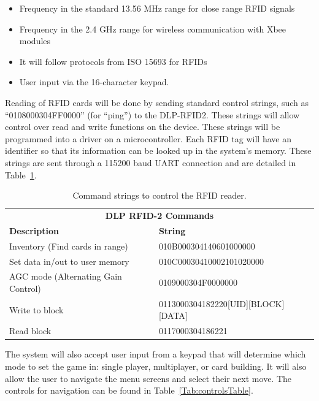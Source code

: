 \documentclass[12pt]{article} %
\begin{document}
\begin{itemize}
	\item Frequency in the standard 13.56 MHz range for close range RFID signals
	\item Frequency in the 2.4 GHz range for wireless communication with Xbee modules
	\item It will follow protocols from ISO 15693 for RFIDs
	\item User input via the 16-character keypad.
\end{itemize}

Reading of RFID cards will be done by sending standard control strings, such as “0108000304FF0000” (for “ping”) to the DLP-RFID2.  These strings will allow control over read and write functions on the device.  These strings will be programmed into a driver on a microcontroller.  Each RFID tag will have an identifier so that its information can be looked up in the system’s memory.   These strings are sent through a 115200 baud UART connection and are detailed in Table~\ref{Tab:DLP RFID-2 input commands}.

\begin{table}[h]
	\begin{tabular}{ll}
		\multicolumn{2}{c}{\textbf{DLP RFID-2 Commands}}                                     \\
		\textbf{Description}                & \textbf{String}                                \\
		Inventory (Find cards in range)     & 010B000304140601000000                         \\
		Set data in/out to user memory      & 010C00030410002101020000                       \\
		AGC mode (Alternating Gain Control) & 0109000304F0000000                             \\
		Write to block                      & 0113000304182220{[}UID{]}{[}BLOCK{]}{[}DATA{]} \\
		Read block                          & 0117000304186221                              
	\end{tabular}
	\caption{Command strings to control the RFID reader.}
	\label{Tab:DLP RFID-2 input commands}
\end{table}

The system will also accept user input from a keypad that will determine which mode to set the game in: single player, multiplayer, or card building. It will also allow the user to navigate the menu screens and select their next move. The controls for navigation can be found in Table~\ref{Tab:controlsTable}.
\end{document}
